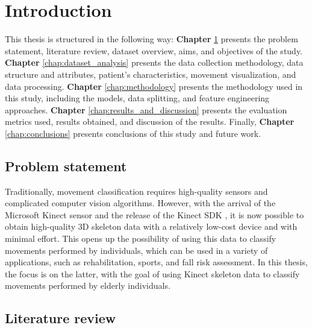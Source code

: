 \hypersetup{colorlinks=true, linkcolor=blue, citecolor=red}

\chapter{Introduction} \label{chap:introduction}

   This thesis is structured in the following way: \textbf{Chapter} \ref{chap:introduction} presents the problem statement, literature review, dataset overview, aims, and objectives of the study. \textbf{Chapter} \ref{chap:dataset_analysis} presents the data collection methodology, data structure and attributes, patient's characteristics, movement visualization, and data processing. \textbf{Chapter} \ref{chap:methodology} presents the methodology used in this study, including the models, data splitting, and feature engineering approaches. \textbf{Chapter} \ref{chap:results_and_discussion} presents the evaluation metrics used, results obtained, and discussion of the results. Finally, \textbf{Chapter} \ref{chap:conclusions} presents conclusions of this study and future work.

   \section{Problem statement}

      Traditionally, movement classification requires high-quality sensors and complicated computer vision algorithms. However, with the arrival of the Microsoft Kinect sensor and the release of the Kinect SDK \cite{jana_kinect_2012}, it is now possible to obtain high-quality 3D skeleton data with a relatively low-cost device and with minimal effort. This opens up the possibility of using this data to classify movements performed by individuals, which can be used in a variety of applications, such as rehabilitation, sports, and fall risk assessment. In this thesis, the focus is on the latter, with the goal of using Kinect skeleton data to classify movements performed by elderly individuals.
  
   \section{Literature review}

